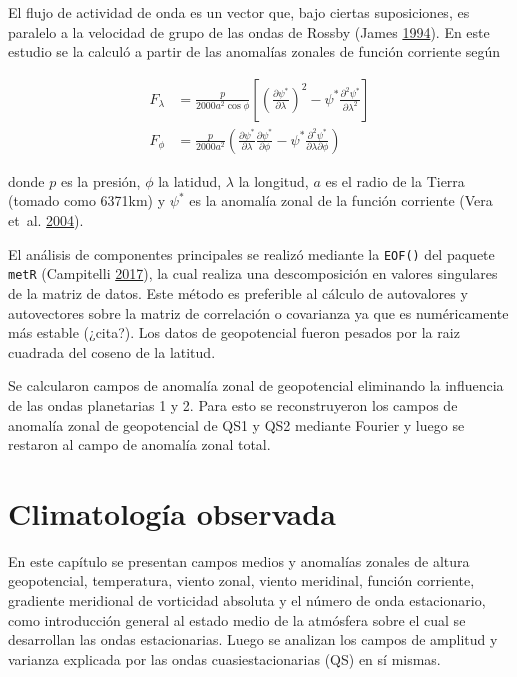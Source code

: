 \documentclass[spanish,a4paper,12p]{book}
\begin{document}
El flujo de actividad de onda es un vector que, bajo ciertas
suposiciones, es paralelo a la velocidad de grupo de las ondas de Rossby
(James \protect\hyperlink{ref-James}{1994}). En este estudio se la
calculó a partir de las anomalías zonales de función corriente según

\[
\begin{aligned}
F_\lambda &= \frac{p}{2000a^2\cos\phi}\left[ \left( \frac{\partial \psi^*}{\partial \lambda} \right)^2 - \psi^*\frac{\partial^2 \psi^*}{\partial \lambda^2}  \right] \\
F_\phi &= \frac{p}{2000a^2} \left( \frac{\partial \psi^*}{\partial \lambda}\frac{\partial \psi^*}{\partial \phi}  - \psi^* \frac{\partial^2 \psi^*}{\partial \lambda \partial \phi} \right) 
\end{aligned}
\]

donde \(p\) es la presión, \(\phi\) la latidud, \(\lambda\) la longitud,
\(a\) es el radio de la Tierra (tomado como 6371km) y \(\psi^*\) es la
anomalía zonal de la función corriente (Vera et~al.
\protect\hyperlink{ref-Vera2004}{2004}).

El análisis de componentes principales se realizó mediante la
\texttt{EOF()} del paquete \texttt{metR} (Campitelli
\protect\hyperlink{ref-R-metR}{2017}), la cual realiza una
descomposición en valores singulares de la matriz de datos. Este método
es preferible al cálculo de autovalores y autovectores sobre la matriz
de correlación o covarianza ya que es numéricamente más estable
(¿cita?). Los datos de geopotencial fueron pesados por la raiz cuadrada
del coseno de la latitud.

Se calcularon campos de anomalía zonal de geopotencial eliminando la
influencia de las ondas planetarias 1 y 2. Para esto se reconstruyeron
los campos de anomalía zonal de geopotencial de QS1 y QS2 mediante
Fourier y luego se restaron al campo de anomalía zonal total.

\chapter{Climatología observada}\label{climatologia-observada}

En este capítulo se presentan campos medios y anomalías zonales de
altura geopotencial, temperatura, viento zonal, viento meridinal,
función corriente, gradiente meridional de vorticidad absoluta y el
número de onda estacionario, como introducción general al estado medio
de la atmósfera sobre el cual se desarrollan las ondas estacionarias.
Luego se analizan los campos de amplitud y varianza explicada por las
ondas cuasiestacionarias (QS) en sí mismas.
\end{document}
